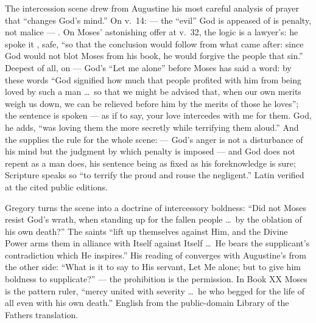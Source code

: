 \begin{witnessnote}
The intercession scene drew from Augustine his most careful analysis of
prayer that ``changes God's mind.'' On v.~14:  --- the ``evil'' God is appeased of is penalty, not malice
--- .
On Moses' astonishing offer at v.~32, the logic is a lawyer's: he spoke it
, safe, ``so that the conclusion would follow from what came
after: since God would not blot Moses from his book, he would forgive the
people that sin.'' Deepest of all, on  --- God's ``Let me
alone'' before Moses has said a word: by these words ``God signified how
much that people profited with him from being loved by such a man \dots\ so
that we might be advised that, when our own merits weigh us down, we can be
relieved before him by the merits of those he loves''; the sentence is
spoken 
--- as if to say, your love intercedes with me for them. God, he adds, ``was
loving them the more secretly while terrifying them aloud.'' And the
 supplies the rule for the whole scene:  ---
God's anger is not a disturbance of his mind but the judgment by which
penalty is imposed --- and God does not repent as a man does, his sentence
being as fixed as his foreknowledge is sure; Scripture speaks so ``to
terrify the proud and rouse the negligent.'' Latin verified at the cited
public editions.
\end{witnessnote}

\begin{witnessnote}
Gregory turns the scene into a doctrine of intercessory boldness: ``Did not
Moses resist God's wrath, when standing up for the fallen people \dots\ by
the oblation of his own death?'' The saints ``lift up themselves against
Him, and the Divine Power arms them in alliance with Itself against Itself
\dots\ He bears the supplicant's contradiction which He inspires.'' His
reading of  converges with Augustine's from the other side:
``What is it to say to His servant, Let Me alone; but to give him boldness
to supplicate?'' --- the prohibition is the permission. In Book XX Moses is
the pattern ruler, ``mercy united with severity \dots\ he who begged for the
life of all even with his own death.'' English from the public-domain
Library of the Fathers translation.
\end{witnessnote}

